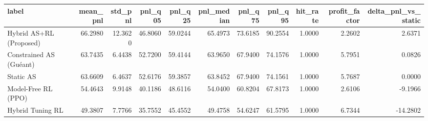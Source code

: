 \begin{tabular}{lrrrrrrrrrr}
\toprule
label & mean\_pnl & std\_pnl & pnl\_q05 & pnl\_q25 & pnl\_median & pnl\_q75 & pnl\_q95 & hit\_rate & profit\_factor & delta\_pnl\_vs\_static \\
\midrule
Hybrid AS+RL (Proposed) & 66.2980 & 12.3620 & 46.8060 & 59.0244 & 65.4973 & 73.6185 & 90.2554 & 1.0000 & 2.2602 & 2.6371 \\
Constrained AS (Guéant) & 63.7435 & 6.4438 & 52.7200 & 59.4144 & 63.9650 & 67.9400 & 74.1576 & 1.0000 & 5.7951 & 0.0826 \\
Static AS & 63.6609 & 6.4637 & 52.6176 & 59.3857 & 63.8452 & 67.9400 & 74.1561 & 1.0000 & 5.7687 & 0.0000 \\
Model-Free RL (PPO) & 54.4643 & 9.9148 & 40.1186 & 48.6116 & 54.0400 & 60.8204 & 67.8173 & 1.0000 & 2.6106 & -9.1966 \\
Hybrid Tuning RL & 49.3807 & 7.7766 & 35.7552 & 45.4552 & 49.4758 & 54.6247 & 61.5795 & 1.0000 & 6.7344 & -14.2802 \\
\bottomrule
\end{tabular}
